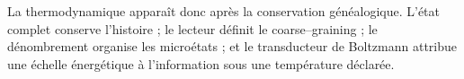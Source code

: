 La thermodynamique apparaît donc après la conservation généalogique.
L'état complet conserve l'histoire ; le lecteur définit le coarse--graining ;
le dénombrement organise les microétats ; et le transducteur de Boltzmann attribue une
échelle énergétique à l'information sous une température déclarée.
